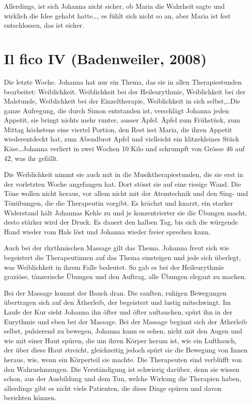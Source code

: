 \documentclass[10pt,titlepage,a5paper]{book}
\begin{document}
Allerdings, ist sich Johanna nicht sicher, ob Maria die Wahrheit sagte und wirklich die Idee gehabt hatte\dots , es fühlt sich nicht so an, aber Maria ist fest entschlossen, das ist sicher.



\section*{Il fico IV (Badenweiler, 2008)}



Die letzte Woche. Johanna hat nur ein Thema, das sie in allen Therapiestunden bearbeitet: Weiblichkeit. Weiblichkeit bei der Heileurythmie, Weiblichkeit bei der Malstunde, Weiblichkeit bei der Einzeltherapie, Weiblichkeit in sich selbst,\dots  Die ganze Aufregung, die durch Simon entstanden ist, verschlägt Johanna jeden Appetit, sie bringt nichts mehr runter, ausser Äpfel. Äpfel zum Frühstück, zum Mittag höchstens eine viertel Portion, den Rest isst Maria, die ihren Appetit wiederentdeckt hat, zum Abendbrot Apfel und vielleicht ein klitzekleines Stück Käse\dots  Johanna verliert in zwei Wochen 10 Kilo und schrumpft von Grösse 46 auf 42, was ihr gefällt.

Die Weiblichkeit nimmt sie auch mit in die Musiktherapiestunden, die sie erst in der vorletzten Woche angefangen hat. Dort stösst sie auf eine riesige Wand. Die Töne wollen nicht heraus, vor allem nicht mit der Atemtechnik und den Sing- und Tönübungen, die die Therapeutin vorgibt. Es krächzt und knarzt, ein starker Widerstand hält Johannas Kehle zu und je konzentrierter sie die Übungen macht, desto stärker wird der Druck. Es dauert den halben Tag, bis sich die würgende Hand wieder vom Hals löst und Johanna wieder freier sprechen kann.

Auch bei der rhythmischen Massage gilt das Thema. Johanna freut sich wie begeistert die Therapeutinnen auf das Thema einsteigen und jede sich überlegt, was Weiblichkeit in ihrem Falle bedeutet. So gab es bei der Heileurythmie graziöse, tänzerische Übungen und den Auftrag, alle Übungen elegant zu machen.

Bei der Massage kommt der Bauch dran. Die sanften, ruhigen Bewegungen übertragen sich auf den Ätherleib, der begeistert und lustig mitschwingt. Im Laufe der Kur sieht Johanna ihn öfter und öfter auftauchen, spürt ihn in der Eurythmie und eben bei der Massage. Bei der Massage beginnt sich der Ätherleib selbst, pulsierend zu bewegen, Johanna kann es sehen, nicht mit den Augen und wie mit einer Haut spüren, die um ihren Körper herum ist, wie ein Lufthauch, der über diese Haut streicht, gleichzeitig jedoch spürt sie die Bewegung von Innen heraus, wie, wenn ein Körperteil sie machte. Die Therapeuten sind verblüfft von den Wahrnehmungen. Die Verständigung ist schwierig darüber, denn sie wissen schon, aus der Ausbildung und dem Tun, welche Wirkung die Therapien haben, allerdings gibt es nicht viele Patienten, die diese Dinge spüren und davon berichten können.
\end{document}
